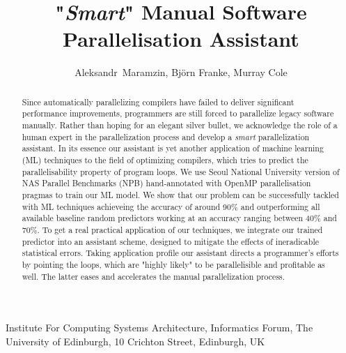 \documentclass{acaces}
\begin{document}
\title{"\textit{Smart}" Manual Software Parallelisation Assistant}

\author{
Aleksandr~Maramzin,
Bj\"{o}rn Franke,
Murray Cole
}

\address{1}{
Institute For Computing Systems Architecture, 
Informatics Forum, 
The University of Edinburgh, 
10 Crichton Street, 
Edinburgh, 
UK
}


\pagestyle{empty}

\begin{abstract}
\null\quad Since automatically parallelizing compilers have failed to deliver significant performance improvements, programmers are still forced to parallelize legacy software manually. Rather than hoping for an elegant silver bullet, we acknowledge the role of a human expert in the parallelization process and develop a \textit{smart} parallelization assistant.\newline\null
\quad In its essence our assistant is yet another application of machine learning (ML) techniques to the field of optimizing compilers, which tries to predict the parallelisability property of program loops. We use Seoul National University version of NAS Parallel Benchmarks (NPB) hand-annotated with OpenMP parallelisation pragmas to train our ML model. We show that  our problem can be successfully tackled with ML techniques achieveing the accuracy of around 90\% and outperforming all available baseline random predictors working at an accuracy ranging between 40\% and 70\%.\newline\null
\quad To get a real practical application of our techniques, we integrate our trained predictor into an assistant scheme, designed to mitigate the effects of ineradicable statistical errors. Taking application profile our assistant directs a programmer's efforts by pointing the loops, which are "highly likely" to be parallelisible and profitable as well. The latter eases and accelerates the manual parallelization process. 
\end{abstract}

\end{document}
